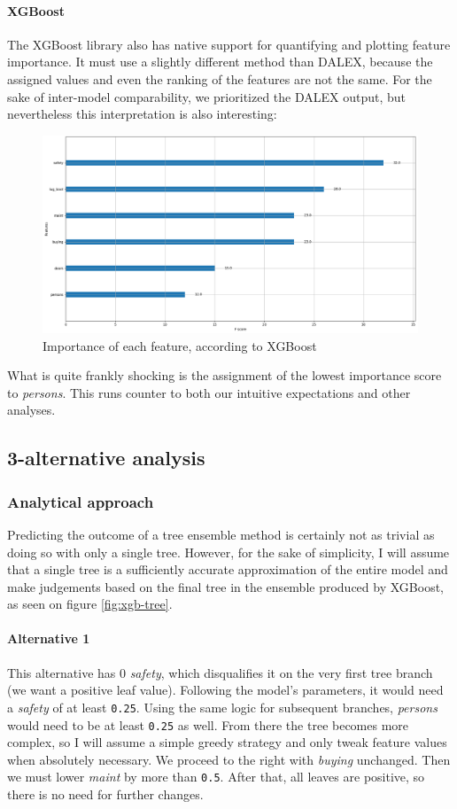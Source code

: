 \documentclass[../main.tex]{subfiles}
\begin{document}
\paragraph{XGBoost} The XGBoost library also has native support for quantifying
and plotting feature importance. It must use a slightly different method than
DALEX, because the assigned values and even the ranking of the features are not
the same. For the sake of inter-model comparability, we prioritized the DALEX
output, but nevertheless this interpretation is also interesting:
\begin{figure}[H]
	\centering
	\includegraphics[width=\linewidth]{../img/xgb-feature-importance-xgboost.png}
	\caption{Importance of each feature, according to XGBoost}
	\label{fig:xgb-feats-xgboost}
\end{figure}
What is quite frankly shocking is the assignment of the lowest importance score
to \emph{persons}. This runs counter to both our intuitive expectations and
other analyses.

\subsection{3-alternative analysis}
\subsubsection{Analytical approach}
Predicting the outcome of a tree ensemble method is certainly not as trivial as
doing so with only a single tree. However, for the sake of simplicity, I will
assume that a single tree is a sufficiently accurate approximation of the
entire model and make judgements based on the final tree in the ensemble
produced by XGBoost, as seen on figure \ref{fig:xgb-tree}.
\paragraph{Alternative 1} This alternative has 0 \emph{safety}, which
disqualifies it on the very first tree branch (we want a positive leaf value).
Following the model's parameters, it would need a \emph{safety} of at least
\verb`0.25`. Using the same logic for subsequent branches, \emph{persons} would
need to be at least \verb`0.25` as well. From there the tree becomes more
complex, so I will assume a simple greedy strategy and only tweak feature
values when absolutely necessary. We proceed to the right with \emph{buying}
unchanged. Then we must lower \emph{maint} by more than \verb`0.5`. After
that, all leaves are positive, so there is no need for further changes.
\end{document}
